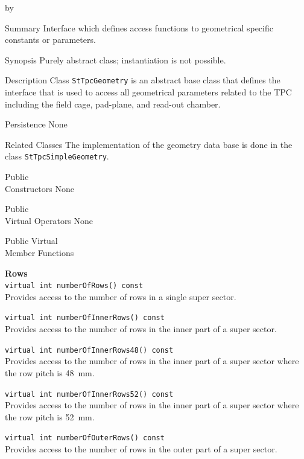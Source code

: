 \documentclass[twoside]{article}
\newcommand{\comp}[1]{\texttt{#1}}%
\newcommand{\entrylabel}[1]{\mbox{\textbf{{#1}}}\hfil}%
\newenvironment{entry}
{\begin{list}{}%
    {\renewcommand{\makelabel}{\entrylabel}%
     \setlength{\labelwidth}{90pt}%
     \setlength{\leftmargin}{\labelwidth}
     \advance\leftmargin by \labelsep%
      }%
    }%
  {\end{list}}
\newcommand{\Entrylabel}[1]%
{\raisebox{0pt}[1ex][0pt]{\makebox[\labelwidth][l]%
    {\parbox[t]{\labelwidth}{\hspace{0pt}\textbf{{#1}}}}}}
\newenvironment{Entry}%
{\renewcommand{\entrylabel}{\Entrylabel}\begin{entry}}%
  {\end{entry}}
\begin{document}
\begin{Entry}
\item[Summary]
    Interface which defines access functions to geometrical specific
    constants or parameters.
    
\item[Synopsis]
    Purely abstract class; instantiation is not possible.

\item[Description]  
Class \comp{StTpcGeometry} is an abstract base class that defines
the interface that is used to access all geometrical parameters 
related to the TPC including the field cage, pad-plane, and read-out
chamber.

\item[Persistence]
   None

\item[Related Classes]
The implementation of the geometry data base is done in
the class \comp{StTpcSimpleGeometry}. 
  
\item[Public \\ Constructors]
   None

\item[Public \\ Virtual Operators]
   None

\item[Public Virtual \\ Member Functions]

  {\bf Rows \\}
  \verb+virtual int numberOfRows() const+\\
  Provides access to the number of rows in a single super sector.

  \verb+virtual int numberOfInnerRows() const+\\
  Provides access to the number of rows in the inner part of a super sector.

  \verb+virtual int numberOfInnerRows48() const+\\
  Provides access to the number of rows in the inner part of a super sector
  where the row pitch is 48~mm.

  \verb+virtual int numberOfInnerRows52() const+\\
  Provides access to the number of rows in the inner part of a super sector
  where the row pitch is 52~mm.

  \verb+virtual int numberOfOuterRows() const+\\
  Provides access to the number of rows in the outer part of a super sector.


\end{Entry}
\end{document}
